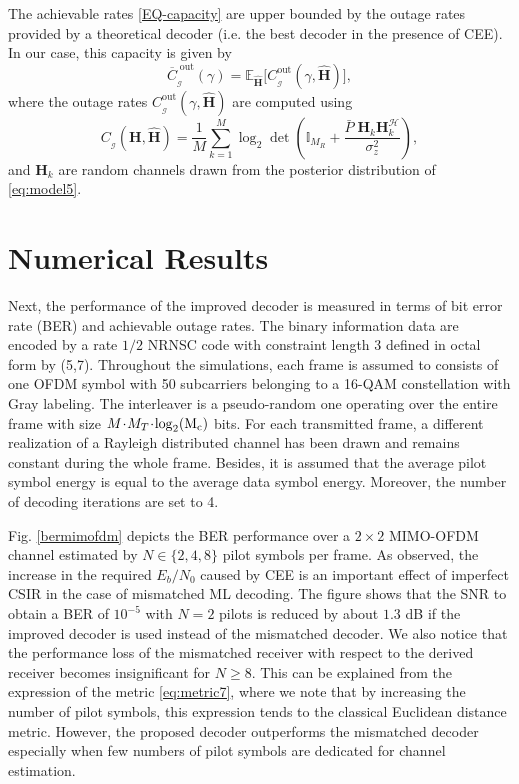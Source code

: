 \documentclass{article}
\def\H{{\mathbf H}}
\def\tg{\mathcal{H}}
\def\eye{{\mathbb I}}
\begin{document}
The achievable rates \eqref{EQ-capacity} are upper bounded by the outage rates provided by a theoretical decoder (i.e. the best decoder in the presence of CEE). In our case, this capacity is given by
\begin{equation}
\overline{C}_{_\mathcal{G}}^{\; \mathrm{out}}(\gamma)=\mathbb{E}_{\widehat{\mathbf{H}}}\big[C_{_\mathcal{G}}^{\mathrm{out}}(\gamma,\widehat{\mathbf{H}})\big], \label{perfect-capacity}
\end{equation}
where the outage rates $C_{_\mathcal{G}}^{\mathrm{out}}(\gamma,\widehat{\mathbf{H}})$ are computed using
\begin{equation}
C_{_\mathcal{G}}(\mathbf{H},\widehat{\mathbf{H}})=\frac{1}{M}\sum\limits_{k=1}^{M} \log_2 \det \left(\eye_{M_R} +\frac{\bar{P}\;\H_k\H_k^\tg}{\sigma^2_z}\right),
\end{equation}
and $\H_k$ are random channels drawn from the posterior distribution of \eqref{eq:model5}.
\vspace{-3mm}
\section{Numerical Results}
\label{sec:simul}


Next, the performance of the improved decoder is measured in terms of bit error rate (BER) and achievable outage rates. The binary information data are encoded by a rate $1/2$ NRNSC code with constraint length 3 defined in octal form by (5,7). Throughout the simulations, each frame is assumed to consists of one OFDM symbol with 50 subcarriers belonging to a 16-QAM constellation with Gray labeling. The interleaver is a pseudo-random one operating over the entire frame with size $M\! \cdot\! M_T\! \cdot\! \log_2(\rm{M_c})$ bits.
For each transmitted frame, a different realization of a Rayleigh distributed channel has been drawn and remains constant during the whole frame. Besides, it is assumed that the average pilot symbol energy is equal to the average data symbol energy. Moreover, the number of decoding iterations are set to 4.

Fig. \ref{bermimofdm} depicts the BER performance over a $2\times2$ MIMO-OFDM channel estimated by $N\in\{2,4,8\}$ pilot symbols per frame. As observed, the increase in the required $E_b/N_0$ caused by CEE is an
important effect of imperfect CSIR in the case of mismatched ML decoding.
The figure shows that the SNR to obtain a BER of $10^{-5}$ with $N=2$ pilots is reduced by about $1.3$ dB if the improved decoder is used instead of the mismatched decoder. We also notice that the performance loss of the mismatched receiver with respect to the derived receiver becomes insignificant for $N\geq8$. This can be explained from the expression of the metric \eqref{eq:metric7}, where we note that by increasing the number of pilot symbols, this expression tends to the classical Euclidean distance metric. However, the proposed decoder outperforms the mismatched decoder especially when few numbers of pilot symbols are dedicated for channel estimation.
\end{document}
